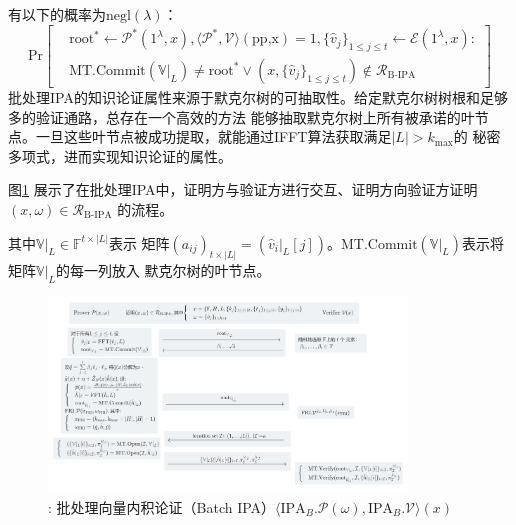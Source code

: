 \documentclass[zihao=-4]{ctexart}
\begin{document}
\begin{itemize}
        有以下的概率为$\text{negl}(\lambda)$：
        \begin{equation}
          \text{Pr}\left[\begin{matrix}&\text{root}^*\leftarrow\mathcal{P}^*(1^{\lambda},x),\langle\mathcal{P}^*,\mathcal{V}\rangle(\text{pp,x})=1,\{\hat{v}_j\}_{1\le j\le t}\leftarrow\mathcal{E}(1^{\lambda},x):\\&\text{MT.Commit}(\mathbb{V}|_L)\neq\text{root}^*\vee(x,\{\hat{v}_j\}_{1\le j\le t})\not\in\mathcal{R}_{\text{B-IPA}}\end{matrix}\right]
        \end{equation}
        批处理IPA的知识论证属性来源于默克尔树的可抽取性。给定默克尔树树根和足够多的验证通路，总存在一个高效的方法
        能够抽取默克尔树上所有被承诺的叶节点。一旦这些叶节点被成功提取，就能通过IFFT算法获取满足$|L|>k_{\max}$的
        秘密多项式，进而实现知识论证的属性\cite{seven}\cite{Fourty-two}。
\end{itemize}\par
图\ref{B-IPA流程} 展示了在批处理IPA中，证明方与验证方进行交互、证明方向验证方证明$(x,\omega)\in\mathcal{R}_{\text{B-IPA}}$
的流程。\par
其中$\mathbb{V}|_L\in\mathbb{F}^{t\times|L|}$表示
矩阵$(a_{ij})_{t\times|L|}=(\hat{v}_i|_L[j])$。$\text{MT.Commit}(\mathbb{V}|_L)$表示将矩阵$\mathbb{V}|_L$的每一列放入
默克尔树的叶节点。
\begin{figure}[H]
  \centering
  \includegraphics[width=0.85\textwidth]{./include_picture/B-IPA.png}
  \caption{: 批处理向量内积论证（Batch IPA）$\langle \text{IPA}_B.\mathcal{P}(\omega),\text{IPA}_B.\mathcal{V}\rangle(x)$}
  \label{B-IPA流程}
\end{figure}
\end{document}
